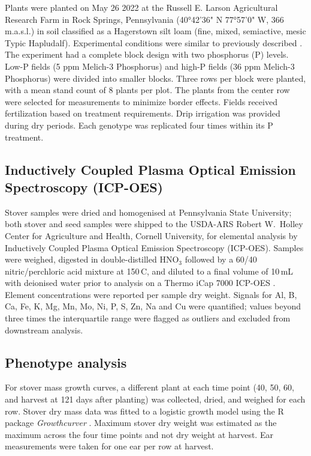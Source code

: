 \documentclass[9pt,twocolumn,twoside]{rilabRxiv}
\begin{document}
Plants were planted on May 26 2022 at the Russell E. Larson Agricultural Research Farm in Rock Springs, Pennsylvania (40°42'36" N 77°57'0" W, 366 m.a.s.l.) in soil classified as a Hagerstown silt loam (fine, mixed, semiactive, mesic Typic Hapludalf).
Experimental conditions were similar to previously described \cite{strock2018}. 
The experiment had a complete block design with two phosphorus (P) levels. 
Low-P fields (5 ppm Melich-3 Phosphorus) and high-P fields (36 ppm Melich-3 Phosphorus) were divided into smaller blocks. 
Three rows per block were planted, with a mean stand count of 8 plants per plot. 
The plants from the center row were selected for measurements to minimize border effects. 
Fields received fertilization based on treatment requirements. 
Drip irrigation was provided during dry periods. 
Each genotype was replicated four times within its P treatment.

\subsection*{Inductively Coupled Plasma Optical Emission Spectroscopy (ICP-OES)}

Stover samples were dried and homogenised at Pennsylvania State University; both stover and seed samples were shipped to the USDA-ARS Robert W.~Holley Center for Agriculture and Health, Cornell University, for elemental analysis by Inductively Coupled Plasma Optical Emission Spectroscopy (ICP-OES).
Samples were weighed, digested in double-distilled HNO$_3$ followed by a 60/40 nitric/perchloric acid mixture at 150\,\textdegree C, and diluted to a final volume of 10\,mL with deionised water prior to analysis on a Thermo iCap 7000 ICP-OES \cite{ishka2025}.
Element concentrations were reported per sample dry weight.
Signals for Al, B, Ca, Fe, K, Mg, Mn, Mo, Ni, P, S, Zn, Na and Cu were quantified; values beyond three times the interquartile range were flagged as outliers and excluded from downstream analysis.

\subsection*{Phenotype analysis}

For stover mass growth curves, a different plant at each time point (40, 50, 60, and harvest at 121 days after planting) was collected, dried, and weighed for each row.
Stover dry mass data was fitted to a logistic growth model using the R package \textit{Growthcurver} \cite{sprouffske2016}.
Maximum stover dry weight was estimated as the maximum across the four time points and not dry weight at harvest.
Ear measurements were taken for one ear per row at harvest.
\end{document}
